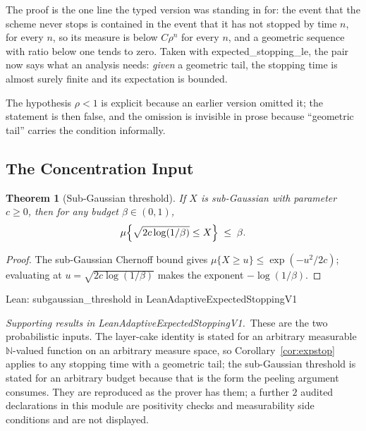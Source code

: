 \documentclass[conference]{IEEEtran}
\newtheorem{theorem}{Theorem}
\theoremstyle{definition}
\newcommand{\lean}[1]{\textsf{\footnotesize #1}}
\newcommand{\leanbox}[1]{%
  \par\vspace{2pt}\noindent
  {\footnotesize\textsf{Lean: #1}}\par\vspace{2pt}}
\begin{document}
The proof is the one line the typed version was standing in for: the event that the scheme
never stops is contained in the event that it has not stopped by time $n$, for every $n$, so
its measure is below $C\rho^{n}$ for every $n$, and a geometric sequence with ratio below one
tends to zero. Taken with \lean{expected\_stopping\_le}, the pair now says what an analysis
needs: \emph{given} a geometric tail, the stopping time is almost surely finite and its
expectation is bounded.

The hypothesis $\rho<1$ is explicit because an earlier version omitted it; the statement is
then false, and the omission is invisible in prose because ``geometric tail'' carries the
condition informally.

\subsection{The Concentration Input}
\label{sec:subgauss}

\begin{theorem}[Sub-Gaussian threshold]
\label{thm:subgauss}
If $X$ is sub-Gaussian with parameter $c\ge0$, then for any budget $\beta\in(0,1)$,
\begin{equation}
\mu\Bigl\{\sqrt{2c\log(1/\beta)}\leq X\Bigr\}\;\leq\;\beta .
\label{eq:subgauss}
\end{equation}
\end{theorem}

\begin{proof}
The sub-Gaussian Chernoff bound gives $\mu\{X\ge u\}\le\exp(-u^{2}/2c)$; evaluating at
$u=\sqrt{2c\log(1/\beta)}$ makes the exponent $-\log(1/\beta)$.
\end{proof}

\leanbox{\lean{subgaussian\_threshold} in \lean{LeanAdaptiveExpectedStoppingV1}}

\noindent\emph{Supporting results in \lean{LeanAdaptiveExpectedStoppingV1}.}~These are the two probabilistic inputs. The layer-cake identity is stated for an arbitrary measurable $\mathbb{N}$-valued function on an arbitrary measure space, so Corollary~\ref{cor:expstop} applies to any stopping time with a geometric tail; the sub-Gaussian threshold is stated for an arbitrary budget because that is the form the peeling argument consumes. They are reproduced as the prover has them; a further $2$ audited declarations in this module are positivity checks and measurability side conditions and are not displayed.
\end{document}
